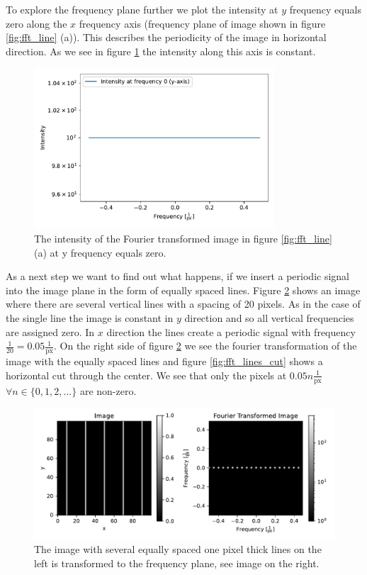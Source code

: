 To explore the frequency plane further we plot the intensity at $y$ frequency equals zero along the $x$ frequency axis (frequency plane of image shown in figure \ref{fig:fft_line} (a)). This describes the periodicity of the image in horizontal direction. As we see in figure \ref{fig:fft_line_cut} the intensity along this axis is constant.
\begin{figure}[H]
	\centering
		\includegraphics[width=0.8\textwidth]{pics/fft_simulation_cutoneline.pdf}
		\caption{The intensity of the Fourier transformed image in figure \ref{fig:fft_line} (a) at y frequency equals zero.}
		\label{fig:fft_line_cut}
\end{figure}
As a next step we want to find out what happens, if we insert a periodic signal into the image plane in the form of equally spaced lines. Figure \ref{fig:fft_lines} shows an image where there are several vertical lines with a spacing of 20 pixels. As in the case of the single line the image is constant in $y$ direction and so all vertical frequencies are assigned zero. In $x$ direction the lines create a periodic signal with frequency $\frac{1}{20} = 0.05 \frac{1}{\mathrm{px}}$. On the right side of figure \ref{fig:fft_lines} we see the fourier transformation of the image with the equally spaced lines and figure \ref{fig:fft_lines_cut} shows a horizontal cut through the center. We see that only the pixels at $0.05n \frac{1}{\mathrm{px}}$ $\forall n \in \{0, 1, 2, ...\}$ are non-zero.
\begin{figure}[H]
	\centering
		\includegraphics[width=1.0\textwidth]{pics/fft_simulationmorelines.pdf}
		\caption{The image with several equally spaced one pixel thick lines on the left is transformed to the frequency plane, see image on the right.}
		\label{fig:fft_lines}
\end{figure}

